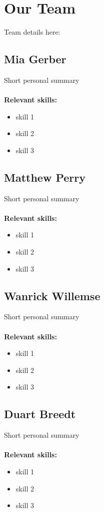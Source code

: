 \documentclass[12pt,a4paper]{article}
\begin{document}
    \newpage
    \section{Our Team}
       Team details here:
        \subsection{Mia Gerber}
        Short personal summary\\\\
        \textbf{\small Relevant skills:}
        \begin{itemize}
            \item skill 1
            \item skill 2
            \item skill 3
        \end{itemize}
        
        
        \subsection{Matthew Perry}
        Short personal summary\\\\
        \textbf{\small Relevant skills:}
        \begin{itemize}
            \item skill 1
            \item skill 2
            \item skill 3
        \end{itemize}
        
        \subsection{Wanrick Willemse}
        Short personal summary\\\\
        \textbf{\small Relevant skills:}
        \begin{itemize}
            \item skill 1
            \item skill 2
            \item skill 3
        \end{itemize}
        
    
        \subsection{Duart Breedt}
        Short personal summary\\\\
        \textbf{\small Relevant skills:}
        \begin{itemize}
            \item skill 1
            \item skill 2
            \item skill 3
        \end{itemize}
        
\end{document}
